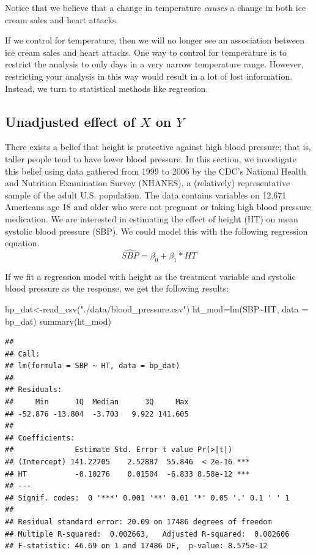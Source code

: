 \documentclass[
]{book}
\newenvironment{Shaded}{\begin{snugshade}}{\end{snugshade}}
\newcommand{\AttributeTok}[1]{\textcolor[rgb]{0.77,0.63,0.00}{#1}}
\newcommand{\FunctionTok}[1]{\textcolor[rgb]{0.00,0.00,0.00}{#1}}
\newcommand{\NormalTok}[1]{#1}
\newcommand{\OtherTok}[1]{\textcolor[rgb]{0.56,0.35,0.01}{#1}}
\newcommand{\SpecialCharTok}[1]{\textcolor[rgb]{0.00,0.00,0.00}{#1}}
\newcommand{\StringTok}[1]{\textcolor[rgb]{0.31,0.60,0.02}{#1}}
\begin{document}
Notice that we believe that a change in temperature \emph{causes} a change in both ice cream sales and heart attacks.

If we control for temperature, then we will no longer see an association between ice cream sales and heart attacks. One way to control for temperature is to restrict the analysis to only days in a very narrow temperature range. However, restricting your analysis in this way would result in a lot of lost information. Instead, we turn to statistical methods like regression.

\hypertarget{unadjusted-effect-of-x-on-y}{%
\subsection{\texorpdfstring{Unadjusted effect of \(X\) on \(Y\)}{Unadjusted effect of X on Y}}\label{unadjusted-effect-of-x-on-y}}

There exists a belief that height is protective against high blood pressure; that is, taller people tend to have lower blood pressure. In this section, we investigate this belief using data gathered from 1999 to 2006 by the CDC's National Health and Nutrition Examination Survey (NHANES), a (relatively) representative sample of the adult U.S. population. The data contains variables on 12,671 Americans age 18 and older who were not pregnant or taking high blood pressure medication. We are interested in estimating the effect of height (HT) on mean systolic blood pressure (SBP). We could model this with the following regression equation.
\[\widehat{SBP}=\beta_0+\beta_1*HT\]

If we fit a regression model with height as the treatment variable and systolic blood pressure as the response, we get the following results:

\begin{Shaded}
\begin{Highlighting}[]
\NormalTok{bp\_dat}\OtherTok{\textless{}{-}}\FunctionTok{read\_csv}\NormalTok{(}\StringTok{"./data/blood\_pressure.csv"}\NormalTok{)}
\NormalTok{ht\_mod}\OtherTok{=}\FunctionTok{lm}\NormalTok{(SBP}\SpecialCharTok{\textasciitilde{}}\NormalTok{HT,}
         \AttributeTok{data =}\NormalTok{ bp\_dat)}
\FunctionTok{summary}\NormalTok{(ht\_mod)}
\end{Highlighting}
\end{Shaded}

\begin{verbatim}
## 
## Call:
## lm(formula = SBP ~ HT, data = bp_dat)
## 
## Residuals:
##     Min      1Q  Median      3Q     Max 
## -52.876 -13.804  -3.703   9.922 141.605 
## 
## Coefficients:
##              Estimate Std. Error t value Pr(>|t|)    
## (Intercept) 141.22705    2.52887  55.846  < 2e-16 ***
## HT           -0.10276    0.01504  -6.833 8.58e-12 ***
## ---
## Signif. codes:  0 '***' 0.001 '**' 0.01 '*' 0.05 '.' 0.1 ' ' 1
## 
## Residual standard error: 20.09 on 17486 degrees of freedom
## Multiple R-squared:  0.002663,   Adjusted R-squared:  0.002606 
## F-statistic: 46.69 on 1 and 17486 DF,  p-value: 8.575e-12
\end{verbatim}
\end{document}
